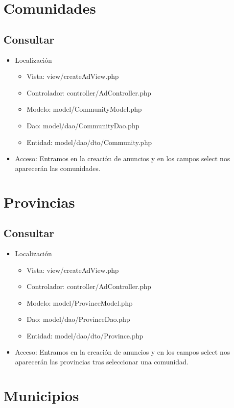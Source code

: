 \section{Comunidades}
\subsection{Consultar}
\begin{itemize}
\item Localizaci\'{o}n
\begin{itemize}
\item Vista: view/createAdView.php
\item Controlador: controller/AdController.php
\item Modelo: model/CommunityModel.php
\item Dao: model/dao/CommunityDao.php
\item Entidad: model/dao/dto/Community.php
\end{itemize}
\item Acceso: Entramos en la creaci\'{o}n de anuncios y en los campos select nos aparecer\'{a}n las comunidades.
\end{itemize}
\section{Provincias}
\subsection{Consultar}
\begin{itemize}
\item Localizaci\'{o}n
\begin{itemize}
\item Vista: view/createAdView.php
\item Controlador: controller/AdController.php
\item Modelo: model/ProvinceModel.php
\item Dao: model/dao/ProvinceDao.php
\item Entidad: model/dao/dto/Province.php
\end{itemize}
\item Acceso: Entramos en la creaci\'{o}n de anuncios y en los campos select nos aparecer\'{a}n las provincias tras seleccionar una comunidad.
\end{itemize}
\section{Municipios}
